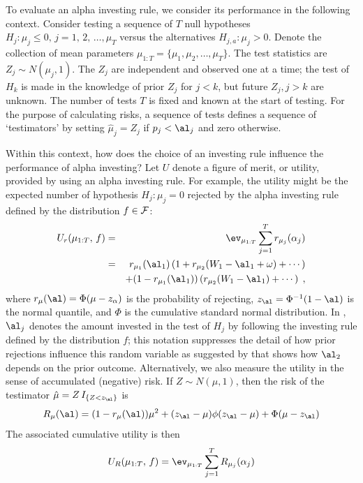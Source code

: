 \documentclass[12pt]{article}
\begin{document}
\clearpage

 To evaluate an alpha investing rule, we consider its performance in the
 following context.  Consider testing a sequence of $T$ null
 hypotheses $H_j: \mu_j \le 0, \, j=1,\,2,\, \ldots, \mu_T$ versus the alternatives
 $H_{j,a}: \mu_j > 0$.   Denote the collection of mean
 parameters $\mu_{1:T} = \{\mu_1, \mu_2, \ldots, \mu_T\}$.  The test statistics
 are $Z_j \sim N(\mu_j,1)$.  The $Z_j$ are independent and observed one at a
 time; the test of $H_k$ is made in the knowledge of prior $Z_j$ for $j<k$, but
 future $Z_j, j > k$ are unknown.  The number of tests $T$ is fixed and known at
 the start of testing.  For the purpose of calculating risks, a sequence of
 tests defines a sequence of `testimators' by setting $\hat\mu_j = Z_j$ if
 $p_j<\al_j$ and zero otherwise.
 

 

 Within this context, how does the choice of an investing rule influence the
 performance of alpha investing?  Let $U$ denote a figure of merit, or utility,
 provided by using an alpha investing rule.  For example, the utility might be
 the expected number of hypothesis $H_j:\mu_j=0$ rejected by the alpha investing
 rule defined by the distribution $f \in {\cal F}$:
 \begin{eqnarray}
    U_r(\mu_{1:T},\,f) 
      &=& \ev_{\mu_{1:T}} \sum_{j=1}^T r_{\mu_j}(\alpha_j) \label{eq:Ur} \\
      &=& r_{\mu_1}(\al_1) \left( 1 + r_{\mu_2}(W_1-\al_1+\omega) + \cdots \right)\cr
      & &  + (1-r_{\mu_1}(\al_1))\left( r_{\mu_2}(W_1-\al_1) + \cdots \right) \;,
 \label{eq:Ure}
 \end{eqnarray}
 where $r_\mu(\al) = \Phi(\mu - z_\alpha)$ is the probability of rejecting,
 $z_\al = \Phi^{-1}(1-\al)$ is the normal quantile, and $\Phi$ is the cumulative
 standard normal distribution.  In , $\al_j$ denotes the amount
 invested in the test of $H_j$ by following the investing rule defined by the
 distribution $f$; this notation suppresses the detail of how prior rejections
 influence this random variable as suggested by  that shows how
 $\al_2$ depends on the prior outcome.  Alternatively, we also measure the
 utility in the sense of accumulated (negative) risk.  If $Z \sim N(\mu,1)$,
 then the risk of the testimator $\hat\mu = Z \,I_{\{Z < z_\al\}}$ is
 \begin{equation}
   R_{\mu}(\al) = (1-r_\mu(\al))\mu^2 + (z_\al-\mu)\phi(z_\al-\mu) + \Phi(\mu-z_\al)
 \label{eq:Rmu}
 \end{equation}
 The associated cumulative utility is then
 \begin{equation}
    U_R(\mu_{1:T},\,f) = \ev_{\mu_{1:T}} \sum_{j=1}^T R_{\mu_j}(\alpha_j) 
 \label{eq:UR}
 \end{equation}
 
\end{document}
